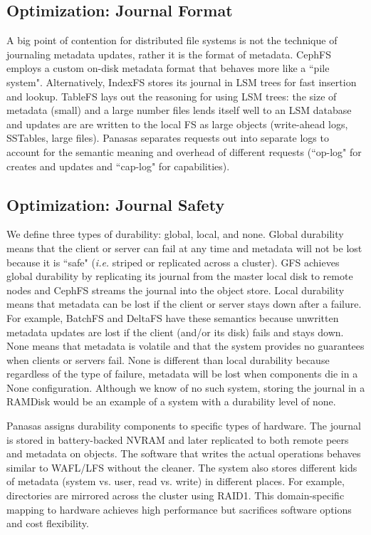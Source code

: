 \subsection{Optimization: Journal Format}

A big point of contention for distributed file systems is not the technique of
journaling metadata updates, rather it is the format of metadata. CephFS
employs a custom on-disk metadata format that behaves more like a ``pile
system". Alternatively, IndexFS stores its journal in LSM trees for fast
insertion and lookup. TableFS lays out the reasoning for using LSM trees: the
size of metadata (small) and a large number files lends itself well to an LSM
database and updates are are written to the local FS as large objects
(write-ahead logs, SSTables, large files). Panasas separates requests out into
separate logs to account for the semantic meaning and overhead of different
requests (``op-log" for creates and updates and ``cap-log" for capabilities).

\subsection{Optimization: Journal Safety}

We define three types of durability: global, local, and none.  Global
durability means that the client or server can fail at any time and metadata
will not be lost because it is ``safe" ({\it i.e.} striped or replicated across
a cluster). GFS achieves global durability by replicating its journal from the
master local disk to remote nodes and CephFS streams the journal into the
object store. Local durability means that metadata can be lost if the client or
server stays down after a failure. For example, BatchFS and DeltaFS have these
semantics because unwritten metadata updates are lost if the client (and/or its
disk) fails and stays down.  None means that metadata is volatile and that the
system provides no guarantees when clients or servers fail.  None is different
than local durability because regardless of the type of failure, metadata will
be lost when components die in a None configuration. Although we know of no
such system, storing the journal in a RAMDisk would be an example of a system
with a durability level of none.

Panasas assigns durability components to specific types of hardware. The
journal is stored in battery-backed NVRAM and later replicated to both remote
peers and metadata on objects. The software that writes the actual operations
behaves similar to WAFL/LFS without the cleaner. The system also stores
different kids of metadata (system vs. user, read vs. write) in different
places. For example, directories are mirrored across the cluster using RAID1.
This domain-specific mapping to hardware achieves high performance but
sacrifices software options and cost flexibility.

